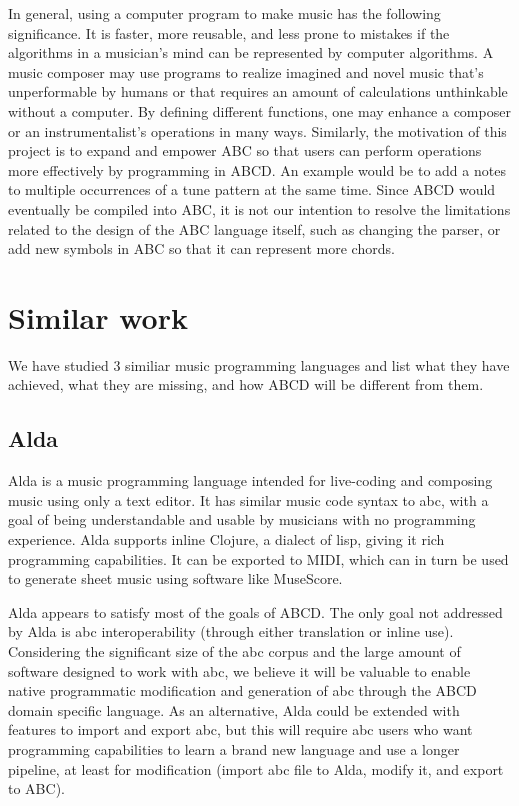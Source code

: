 In general, using a computer program to make music has the following significance. It is faster, more reusable, and less prone to mistakes if the algorithms in a musician's mind can be represented by computer algorithms. A music composer may use programs to realize imagined and novel music that's unperformable by humans or that requires an amount of calculations unthinkable without a computer. By defining different functions, one may enhance a composer or an instrumentalist's operations in many ways\cite{Dobrian88}. Similarly, the motivation of this project is to expand and empower ABC so that users can perform operations more effectively by programming in ABCD. An example would be to add a notes to multiple occurrences of a tune pattern at the same time.  Since ABCD would eventually be compiled into ABC, it is not our intention to resolve the limitations related to the design of the ABC language itself, such as changing the parser, or add new symbols in ABC so that it can represent more chords. 
 


\section{Similar work}

We have studied 3 similiar music programming languages and list what they have achieved, what they are missing, and how ABCD will be different from them.

\subsection{Alda}

Alda is a music programming language intended for live-coding and composing music using only a text editor. It has similar music code syntax to abc, with a goal of being understandable and usable by musicians with no programming experience\cite{Yarwood15}. Alda supports inline Clojure, a dialect of lisp\cite{Hickey17}, giving it rich programming capabilities. It can be exported to MIDI\cite{Yarwood15_2}, which can in turn be used to generate sheet music using software like MuseScore\cite{MuseScore17}. 


Alda appears to satisfy most of the goals of ABCD. The only goal not addressed by Alda is abc interoperability (through either translation or inline use). Considering the significant size of the abc corpus and the large amount of software designed to work with abc, we believe it will be valuable to enable native programmatic modification and generation of abc through the ABCD domain specific language. As an alternative, Alda could be extended with features to import and export abc, but this will require abc users who want programming capabilities to learn a brand new language and use a longer pipeline, at least for modification (import abc file to Alda, modify it, and export to ABC).


